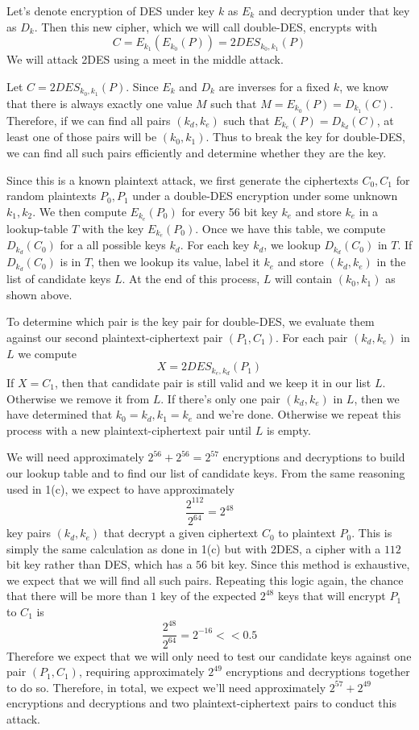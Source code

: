 Let's denote encryption of DES under key $k$ as $E_k$ and decryption under that key as
$D_k$. Then this new cipher, which we will call double-DES, encrypts with \[C =
E_{k_1}(E_{k_0}(P)) = 2DES_{k_0,k_1}(P)\] We will attack 2DES using a meet in the middle
attack. 

Let $C = 2DES_{k_0, k_1}(P)$. Since $E_k$ and $D_k$ are inverses for a fixed $k$, we know
that there is always exactly one value $M$ such that $M = E_{k_0}(P) = D_{k_1}(C)$.
Therefore, if we can find all pairs $(k_d, k_e)$ such that $E_{k_e}(P) = D_{k_d}(C)$, at
least one of those pairs will be $(k_0, k_1)$. Thus to break the key for double-DES,
we can find all such pairs efficiently and determine whether they are the key. 

Since this is a known plaintext attack, we first generate the ciphertexts $C_0, C_1$ for
random plaintexts $P_0, P_1$ under a double-DES encryption under some unknown $k_1, k_2$.
We then compute $E_{k_e}(P_0)$ for every 56 bit key $k_e$ and store $k_e$ in a lookup-table
$T$ with the key $E_{k_e}(P_0)$. Once we have this table, we compute $D_{k_d}(C_0)$ for a
all possible keys $k_d$. For each key $k_d$, we lookup $D_{k_d}(C_0)$ in $T$. If
$D_{k_d}(C_0)$ is in $T$, then we lookup its value, label it $k_e$ and store $(k_d, k_e)$
in the list of candidate keys $L$. At the end of this process, $L$ will contain $(k_0, k_1)$ as shown above.

To determine which pair is the key pair for double-DES, we evaluate them against our
second plaintext-ciphertext pair $(P_1, C_1)$. For each pair $(k_d, k_e)$ in $L$ we compute \[X =
2DES_{k_e, k_d}(P_1)\] If $X = C_1$, then that candidate pair is still valid and we keep it in our list $L$. Otherwise we remove it from $L$. If there's only one pair $(k_d, k_e)$ in $L$, then we have determined that $k_0 = k_d, k_1 = k_e$ and we're
done. Otherwise we repeat this process with a new plaintext-ciphertext pair until $L$ is empty.

We will need approximately $2^{56} + 2^{56} = 2^{57}$ encryptions and decryptions to build our lookup
table and to find our list of candidate keys. From the same reasoning used in 1(c), we expect to have approximately \[\frac{2^{112}}{2^{64}} = 2^{48}\] key pairs $(k_d, k_e)$ that decrypt a given ciphertext $C_0$ to plaintext $P_0$. This is simply the same calculation as done in 1(c) but with 2DES, a cipher with a $112$ bit key rather than DES, which has a $56$ bit key. Since this method is exhaustive, we expect that we will find all such pairs. Repeating this logic again, the chance that there will be more than $1$ key of the expected $2^{48}$ keys that will encrypt $P_1$ to $C_1$ is \[\frac{2^{48}}{2^{64}} = 2^{-16} << 0.5\] Therefore we expect that we
will only need to test our candidate keys against one pair $(P_1, C_1)$, requiring approximately $2^{49}$ encryptions and decryptions together to do so. Therefore, in total, we expect we'll need approximately $2^{57} + 2^{49}$ encryptions and decryptions and two plaintext-ciphertext pairs to conduct this attack. 
